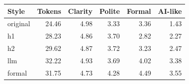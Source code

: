 \begin{tabular}{lrrrrr}\toprule
Style & Tokens & Clarity & Polite & Formal & AI-like\\\midrule
original & 24.46 & 4.98 & 3.33 & 3.36 & 1.43\\
h1 & 28.23 & 4.86 & 3.70 & 2.82 & 2.27\\
h2 & 29.62 & 4.87 & 3.72 & 3.23 & 2.47\\
llm & 32.22 & 4.93 & 3.69 & 4.02 & 3.38\\
formal & 31.75 & 4.73 & 4.28 & 4.49 & 3.55\\
\bottomrule\end{tabular}
